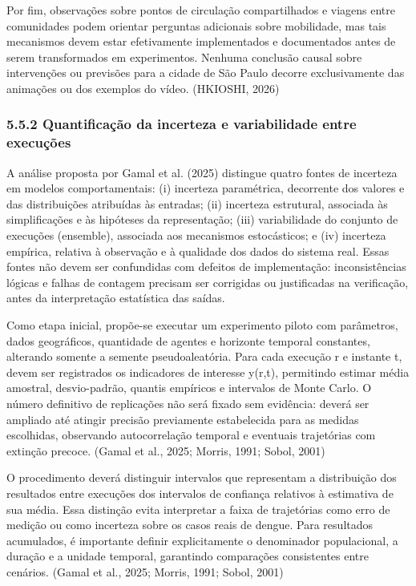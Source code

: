 Por fim, observações sobre pontos de circulação compartilhados e viagens
entre comunidades podem orientar perguntas adicionais sobre mobilidade,
mas tais mecanismos devem estar efetivamente implementados e
documentados antes de serem transformados em experimentos. Nenhuma
conclusão causal sobre intervenções ou previsões para a cidade de São
Paulo decorre exclusivamente das animações ou dos exemplos do vídeo.
(HKIOSHI, 2026)

\subsubsection{5.5.2 Quantificação da incerteza e variabilidade entre
execuções}\label{quantificauxe7uxe3o-da-incerteza-e-variabilidade-entre-execuuxe7uxf5es}

A análise proposta por Gamal et al. (2025) distingue quatro fontes de
incerteza em modelos comportamentais: (i) incerteza paramétrica,
decorrente dos valores e das distribuições atribuídas às entradas; (ii)
incerteza estrutural, associada às simplificações e às hipóteses da
representação; (iii) variabilidade do conjunto de execuções (ensemble),
associada aos mecanismos estocásticos; e (iv) incerteza empírica,
relativa à observação e à qualidade dos dados do sistema real. Essas
fontes não devem ser confundidas com defeitos de implementação:
inconsistências lógicas e falhas de contagem precisam ser corrigidas ou
justificadas na verificação, antes da interpretação estatística das
saídas.

Como etapa inicial, propõe-se executar um experimento piloto com
parâmetros, dados geográficos, quantidade de agentes e horizonte
temporal constantes, alterando somente a semente pseudoaleatória. Para
cada execução r e instante t, devem ser registrados os indicadores de
interesse y(r,t), permitindo estimar média amostral, desvio-padrão,
quantis empíricos e intervalos de Monte Carlo. O número definitivo de
replicações não será fixado sem evidência: deverá ser ampliado até
atingir precisão previamente estabelecida para as medidas escolhidas,
observando autocorrelação temporal e eventuais trajetórias com extinção
precoce. (Gamal et al., 2025; Morris, 1991; Sobol, 2001)

O procedimento deverá distinguir intervalos que representam a
distribuição dos resultados entre execuções dos intervalos de confiança
relativos à estimativa de sua média. Essa distinção evita interpretar a
faixa de trajetórias como erro de medição ou como incerteza sobre os
casos reais de dengue. Para resultados acumulados, é importante definir
explicitamente o denominador populacional, a duração e a unidade
temporal, garantindo comparações consistentes entre cenários. (Gamal et
al., 2025; Morris, 1991; Sobol, 2001)

